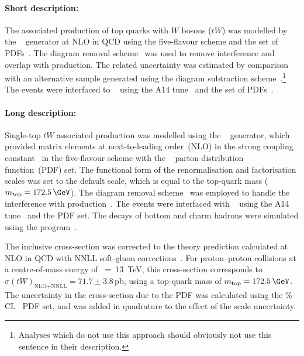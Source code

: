 \paragraph{Short description:}

The associated production of top quarks with $W$ bosons ($tW$) was
modelled by the
\POWHEGBOX[v2]~\cite{Re:2010bp,Nason:2004rx,Frixione:2007vw,Alioli:2010xd}
generator at NLO in QCD using the five-flavour scheme and the
\NNPDF[3.0nlo] set of PDFs~\cite{Ball:2014uwa}.
The diagram removal scheme~\cite{Frixione:2008yi} was used to
remove interference and overlap with \ttbar production. 
The related uncertainty was estimated by comparison with an alternative sample
generated using the diagram subtraction scheme~\cite{Frixione:2008yi,ATL-PHYS-PUB-2016-020}.\footnote{Analyses which do not use this approach 
should obviously not use this sentence in their description.} 
The events were interfaced to \PYTHIA[8.230]~\cite{Sjostrand:2014zea} using the A14
tune~\cite{ATL-PHYS-PUB-2014-021} and the \NNPDF[2.3lo] set of
PDFs~\cite{Ball:2012cx}.




\paragraph{Long description:}

Single-top $tW$ associated production was modelled using the
\POWHEGBOX[v2]~\cite{Re:2010bp,Nason:2004rx,Frixione:2007vw,Alioli:2010xd}
generator, which provided matrix elements at next-to-leading
order~(NLO) in the strong coupling constant \alphas\ in the five-flavour 
scheme with the \NNPDF[3.0nlo]~\cite{Ball:2014uwa} parton
distribution function~(PDF) set.  The functional form of the
renormalisation and factorisation scales was set to the default scale,
which is equal to the top-quark mass ($\mtop = 172.5\,\GeV$).  
The diagram removal scheme~\cite{Frixione:2008yi} was employed to handle the interference
with \ttbar production~\cite{ATL-PHYS-PUB-2016-020}.  The events were
interfaced with \PYTHIA[8.230]~\cite{Sjostrand:2014zea} using the A14
tune~\cite{ATL-PHYS-PUB-2014-021} and the \NNPDF[2.3lo] PDF set.  The
decays of bottom and charm hadrons were simulated using the
\EVTGEN[1.6.0] program~\cite{Lange:2001uf}.

The inclusive cross-section was corrected to the theory prediction
calculated at NLO in QCD with NNLL soft-gluon
corrections~\cite{Kidonakis:2010ux,Kidonakis:2013zqa}.  For proton--proton
collisions at a centre-of-mass energy of \rts~=~\SI{13}{\TeV}, this
cross-section corresponds to $\sigma(tW)_\text{NLO+NNLL}= 71.7\pm3.8$\,pb,
using a top-quark mass of $\mtop = 172.5\,\GeV$.  The uncertainty in
the cross-section due to the PDF was calculated using the \%
CL~\cite{Martin:2009iq,Martin:2009bu} PDF set, and was added in
quadrature to the effect of the scale uncertainty.

